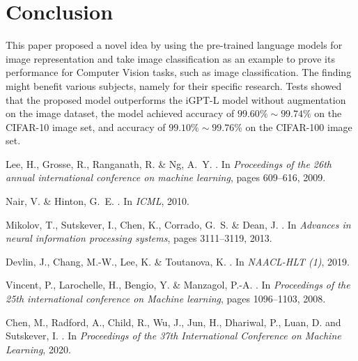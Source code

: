 \documentclass[review]{cvpr}
\begin{document}
\section{Conclusion}

 This paper proposed a novel idea by using the pre-trained language models for image representation and take image classification
 as an example to prove its performance for Computer Vision tasks, such as image classification.
 The finding might benefit various subjects, namely  for their specific research.
Tests showed that the proposed model outperforms the iGPT-L model without augmentation on the image dataset,
the model achieved accuracy of $99.60\%\sim99.74\%$ on the CIFAR-10 image set,
and accuracy of $99.10\%\sim99.76\%$ on the CIFAR-100 image set.


{\small

%
\begin{thebibliography}{10}

Lee, H., Grosse, R., Ranganath, R. \&  Ng, A.~Y.
.
\newblock In {\em Proceedings of the 26th annual international conference on
  machine learning}, pages 609--616, 2009.


Nair, V. \&  Hinton, G.~E.
.
\newblock In {\em ICML}, 2010.


Mikolov, T., Sutskever, I., Chen, K., Corrado, G.~S. \&  Dean, J.
.
\newblock In {\em Advances in neural information processing systems}, pages
  3111--3119, 2013.


Devlin, J., Chang, M.-W., Lee, K. \&  Toutanova, K.
.
\newblock In {\em NAACL-HLT (1)}, 2019.


Vincent, P., Larochelle, H., Bengio, Y. \&  Manzagol, P.-A.
.
\newblock In {\em Proceedings of the 25th international conference on Machine
  learning}, pages 1096--1103, 2008.


Chen, M., Radford, A., Child, R., Wu, J., Jun, H., Dhariwal, P., Luan, D.
 and Sutskever, I.
.
\newblock In {\em Proceedings of the 37th International Conference on Machine
  Learning}, 2020.



\end{thebibliography}}
\end{document}

